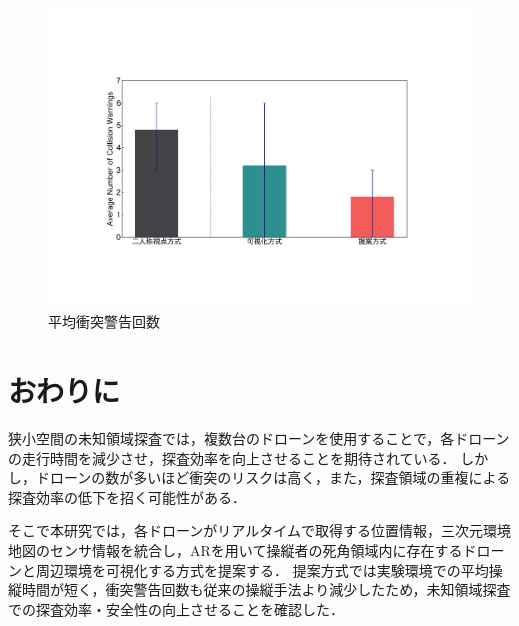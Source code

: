 \documentclass[a4paper,10pt,twocolumn,uplatex]{jsarticle}
\begin{document}
\begin{figure}[!tb]
  \centering
  \includegraphics[width=0.9\linewidth]{img/05_collision.pdf}
  \caption{平均衝突警告回数}
  \label{fig:05_collision}
\end{figure}



\section{おわりに}

狭小空間の未知領域探査では，複数台のドローンを使用することで，各ドローンの走行時間を減少させ，探査効率を向上させることを期待されている．
しかし，ドローンの数が多いほど衝突のリスクは高く，また，探査領域の重複による探査効率の低下を招く可能性がある．

そこで本研究では，各ドローンがリアルタイムで取得する位置情報，三次元環境地図のセンサ情報を統合し，ARを用いて操縦者の死角領域内に存在するドローンと周辺環境を可視化する方式を提案する．
提案方式では実験環境での平均操縦時間が短く，衝突警告回数も従来の操縦手法より減少したため，未知領域探査での探査効率・安全性の向上させることを確認した．
\end{document}
